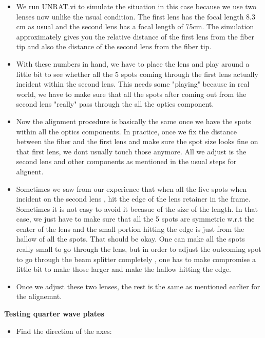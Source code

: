 {\begin{itemize}
\item We run UNRAT.vi to simulate the situation in this case because we use
two lenses now unlike the usual condition. The first lens has the focal
length 8.3 cm as usual and the second lens has a focal length of 75cm. The
simulation approximately gives you the relative distance of the first lens
from the fiber tip and also the distance of the second lens from the fiber
tip.

\item With these numbers in hand, we have to place the lens and play around a
little bit to see whether all the 5 spots coming through the first lens
actually incident within the second lens. This needs some "playing"
because in real world, we have to make sure that all the spots after
coming out from  the second lens "really" pass through the all the optics
component.

\item Now the alignment procedure is basically the same once we have the
spots within all the optics components. In practice, once we fix the
distance between the fiber and the first lens and make sure the spot size
looks fine on that first lens, we dont usually touch those anymore. All we
adjust is the second lens and other components as mentioned in the usual
steps for alignent.

\item Sometimes we saw from our experience that when all the five spots when
incident on the second lens , hit the edge of the lens retainer in the
frame. Sometimes it is not easy to avoid it becasue of the size of the
length. In that case, we just have to make sure that all the 5 spots are
symmetric w.r.t the center of the lens and the small portion hitting the
edge is just from the hallow of all the spots. That should be okay. One
can make all the spots really small to go through the lens, but in order
to adjust the outcoming spot to go through the beam splitter completely ,
one has to make compromise a little bit to make those larger and make the
hallow  hitting the edge.

\item Once we adjust these two lenses, the rest is the same as mentioned
earlier for the alignemnt.

\end{itemize}

\medskip
\noindent
{\bf{Testing quarter wave plates}}

\begin{itemize}
\item Find the direction of the axes:


\end{itemize}}
